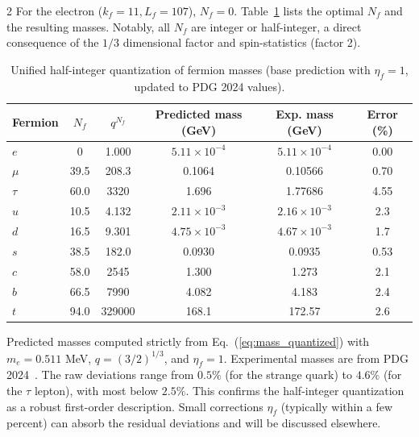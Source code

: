 \documentclass[11pt,a4paper]{article}
\begin{document}
\begin{multicols}{2}
		For the electron (\(k_f=11, L_f=107\)), \(N_f=0\). Table~\ref{tab:fermions_new} lists the optimal \(N_f\) and the resulting masses. Notably, all \(N_f\) are integer or half-integer, a direct consequence of the \(1/3\) dimensional factor and spin-statistics (factor 2).
		
		\begin{table}[H]
			\centering
			\caption{Unified half-integer quantization of fermion masses (base prediction with \(\eta_f=1\), updated to PDG 2024 values).}
			\label{tab:fermions_new}
			\tiny  
			\begin{tabular}{l c c c c c}
				\toprule
				Fermion & \(N_f\) & \(q^{N_f}\) & Predicted mass (GeV) & Exp. mass (GeV) & Error (\%) \\
				\midrule
				\(e\)   & 0      & 1.000 & \(5.11\times10^{-4}\) & \(5.11\times10^{-4}\) & 0.00 \\
				\(\mu\)  & 39.5   & 208.3 & 0.1064                & 0.10566              & 0.70 \\
				\(\tau\) & 60.0   & 3320  & 1.696                 & 1.77686              & 4.55 \\
				\(u\)   & 10.5   & 4.132 & \(2.11\times10^{-3}\)   & \(2.16\times10^{-3}\)  & 2.3 \\
				\(d\)   & 16.5   & 9.301 & \(4.75\times10^{-3}\)   & \(4.67\times10^{-3}\)  & 1.7 \\
				\(s\)   & 38.5   & 182.0 & 0.0930                & 0.0935               & 0.53 \\
				\(c\)   & 58.0   & 2545  & 1.300                 & 1.273                & 2.1 \\
				\(b\)   & 66.5   & 7990  & 4.082                 & 4.183                & 2.4 \\
				\(t\)   & 94.0   & 329000& 168.1                 & 172.57               & 2.6 \\
				\bottomrule
			\end{tabular}
			\par\smallskip
			\footnotesize 
			Predicted masses computed strictly from Eq.~(\ref{eq:mass_quantized}) with \(m_e = 0.511\) MeV, \(q = (3/2)^{1/3}\), and \(\eta_f = 1\). 
			Experimental masses are from PDG 2024~\cite{PDG2024}. 
			The raw deviations range from \(0.5\%\) (for the strange quark) to \(4.6\%\) (for the \(\tau\) lepton), with most below \(2.5\%\). 
			This confirms the half-integer quantization as a robust first-order description. 
			Small corrections \(\eta_f\) (typically within a few percent) can absorb the residual deviations and will be discussed elsewhere.
		\end{table}
		

\end{multicols}
\end{document}
